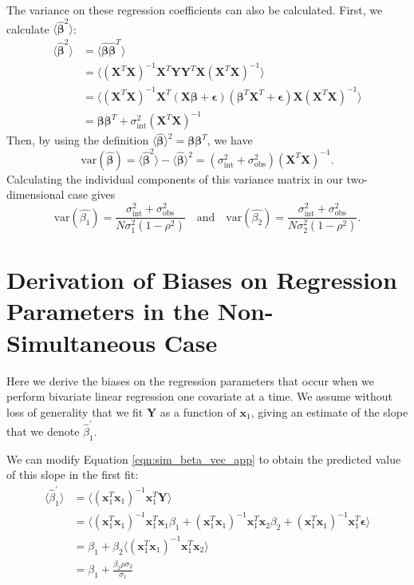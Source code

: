 The variance on these regression coefficients can also be calculated. First, we calculate $\langle\bm{\hat{\beta}}^2\rangle$:
\begin{align*}
    \langle\bm{\hat{\beta}}^2\rangle &= \langle\bm{\hat{\beta}}\bm{\hat{\beta}}^T\rangle \\
    &= \langle(\bm{X}^T\bm{X})^{-1}\bm{X}^T\bm{YY}^T\bm{X}(\bm{X}^T\bm{X})^{-1}\rangle \\
    &= \langle(\bm{X}^T\bm{X})^{-1}\bm{X}^T(\bm{X\beta}+\bm{\epsilon})(\bm{\beta}^T\bm{X}^T+\bm{\epsilon})\bm{X}(\bm{X}^T\bm{X})^{-1}\rangle\\
    &= \bm{\beta\beta}^T + \sigma_\text{int}^2(\bm{X}^T\bm{X})^{-1}
\end{align*}
Then, by using the definition $\langle\bm{\hat{\beta}}\rangle^2 = \bm{\beta\beta}^T$, we have
$$\text{var}(\bm{\hat{\beta}})= \langle\bm{\hat{\beta}}^2\rangle-\langle\bm{\hat{\beta}}\rangle^2 = (\sigma_\text{int}^2 + \sigma_\text{obs}^2)(\bm{X}^T\bm{X})^{-1}.$$
Calculating the individual components of this variance matrix in our two-dimensional case gives
\begin{equation}
    \text{var}(\hat{\beta_1})=\frac{\sigma_\text{int}^2+\sigma_\text{obs}^2}{N\sigma_1^2\left(1-\rho^2\right)}\quad\text{and}\quad\text{var}(\hat{\beta_2})=\frac{\sigma_\text{int}^2+\sigma_\text{obs}^2}{N\sigma_2^2\left(1-\rho^2\right)}.
    \label{eqn:var_betahat_simultaneous}
\end{equation}


\section{Derivation of Biases on Regression Parameters in the Non-Simultaneous Case}
\label{app:non_simultaneous_ols}
Here we derive the biases on the regression parameters that occur when we perform bivariate linear regression one covariate at a time. We assume without loss of generality that we fit $\bm{Y}$ as a function of $\bm{x}_1$, giving an estimate of the slope that we denote $\hat{\beta}_1^\prime$.

We can modify Equation \ref{eqn:sim_beta_vec_app} to obtain the predicted value of this slope in the first fit:
\begin{align*}
    \langle\hat{\beta}_1^\prime\rangle &= \langle(\bm{x}_1^T\bm{x}_1)^{-1}\bm{x}_1^T\bm{Y}\rangle\\
    &= \langle(\bm{x}_1^T\bm{x}_1)^{-1}\bm{x}_1^T\bm{x}_1\beta_1 + (\bm{x}_1^T\bm{x}_1)^{-1}\bm{x}_1^T\bm{x}_2\beta_2 + (\bm{x}_1^T\bm{x}_1)^{-1}\bm{x}_1^T\bm{\epsilon}\rangle\\
    &= \beta_1 + \beta_2\langle(\bm{x}_1^T\bm{x}_1)^{-1}\bm{x}_1^T\bm{x}_2\rangle\\
    &= \beta_1 + \frac{\beta_2\rho\sigma_2}{\sigma_1}
\end{align*}

